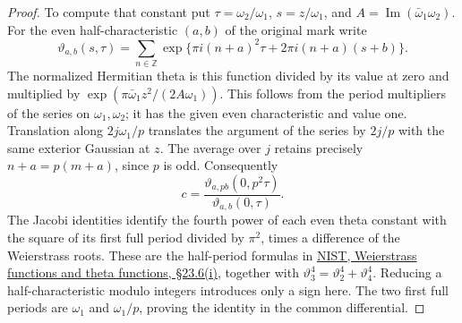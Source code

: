 \documentclass[a4paper,11pt]{article}
\theoremstyle{definition}
\theoremstyle{remark}
\numberwithin{equation}{section}
\begin{document}
\begin{proof}
To compute that constant put \(\tau=\omega_2/\omega_1\),
\(s=z/\omega_1\), and \(A=\operatorname{Im}(\bar\omega_1\omega_2)\).
For the even half-characteristic \((a,b)\) of the original mark
write
\[
 \vartheta_{a,b}(s,\tau)=
    \sum_{n\in\mathbb Z}\exp\{\pi i(n+a)^2\tau+
                                      2\pi i(n+a)(s+b)\}.
\]
The normalized Hermitian theta is this function divided by its
value at zero and multiplied by
\(\exp(\pi\bar\omega_1 z^2/(2A\omega_1))\).
This follows from the period multipliers of the series on
\(\omega_1,\omega_2\); it has the given even characteristic
and value one. Translation along \(2j\omega_1/p\) translates
the argument of the series by \(2j/p\) with the same exterior
Gaussian at \(z\). The average over \(j\) retains precisely
\(n+a=p(m+a)\), since \(p\) is odd. Consequently
\[
 c=\frac{\vartheta_{a,pb}(0,p^2\tau)}
          {\vartheta_{a,b}(0,\tau)} .
\]
The Jacobi identities identify the fourth power of each even
theta constant with the square of its first full period divided
by \(\pi^2\), times a difference of the Weierstrass roots.
These are the half-period formulas in
\href{https://dlmf.nist.gov/23.6.i}{NIST, Weierstrass functions
and theta functions, \S23.6(i)}, together with
\(\vartheta_3^4=\vartheta_2^4+\vartheta_4^4\).
Reducing a half-characteristic modulo integers introduces only
a sign here. The two first full periods are \(\omega_1\) and
\(\omega_1/p\), proving the identity in the common differential.
\end{proof}
\end{document}
